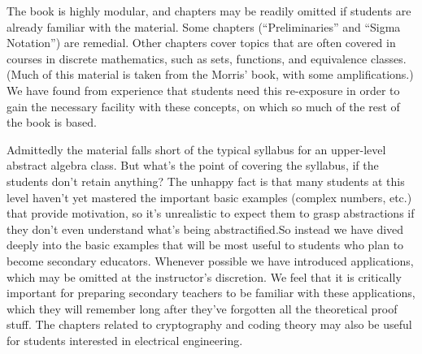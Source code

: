 The book is highly modular, and chapters may be readily omitted if students are already familiar with the material. Some chapters  (``Preliminaries'' and ``Sigma Notation'') are remedial. Other chapters cover topics that are often covered in courses in discrete mathematics, such as sets, functions, and equivalence classes. (Much of this material is taken from the Morris' book, with some amplifications.) We have found from experience that students need this re-exposure in order to gain the necessary facility with these concepts, on which so much of the rest of the book is based.

Admittedly the material falls short of the typical syllabus for an upper-level abstract algebra class. But what's the point of covering the syllabus, if the students don't retain anything?  The unhappy fact is that many students at this level haven't yet mastered the important basic examples (complex numbers, etc.) that provide motivation, so it's unrealistic to expect them to grasp abstractions if they don't even understand what's being abstractified.So instead we have dived deeply into the basic examples that will be most useful to students who plan to become secondary educators. Whenever possible we have introduced applications, which may be omitted at the instructor's discretion. We feel that it is critically important for preparing secondary teachers to be familiar with these applications, which they will remember  long after they've forgotten all the theoretical proof stuff. The chapters related to cryptography and coding theory may also be useful for students interested in electrical engineering. 



